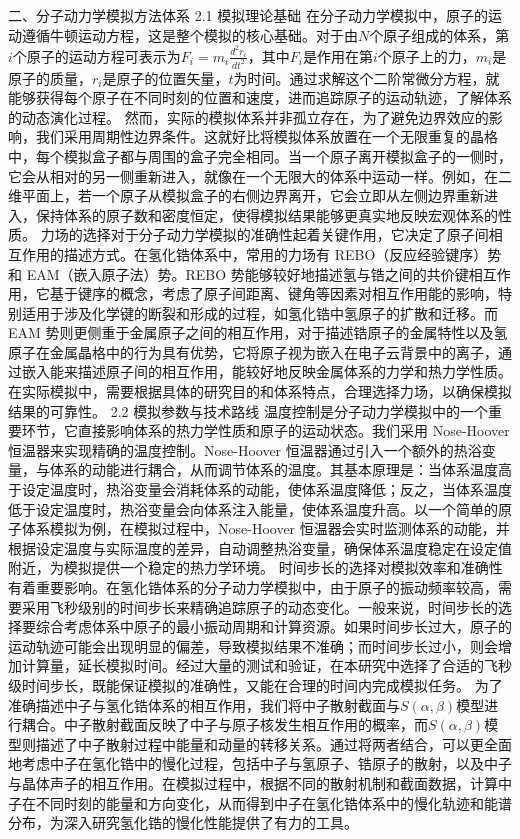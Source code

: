 二、分子动力学模拟方法体系
2.1 模拟理论基础
在分子动力学模拟中，原子的运动遵循牛顿运动方程，这是整个模拟的核心基础。对于由\(N\)个原子组成的体系，第\(i\)个原子的运动方程可表示为\(F_{i}=m_{i}\frac{d^{2}r_{i}}{dt^{2}}\)，其中\(F_{i}\)是作用在第\(i\)个原子上的力，\(m_{i}\)是原子的质量，\(r_{i}\)是原子的位置矢量，\(t\)为时间。通过求解这个二阶常微分方程，就能够获得每个原子在不同时刻的位置和速度，进而追踪原子的运动轨迹，了解体系的动态演化过程。
然而，实际的模拟体系并非孤立存在，为了避免边界效应的影响，我们采用周期性边界条件。这就好比将模拟体系放置在一个无限重复的晶格中，每个模拟盒子都与周围的盒子完全相同。当一个原子离开模拟盒子的一侧时，它会从相对的另一侧重新进入，就像在一个无限大的体系中运动一样。例如，在二维平面上，若一个原子从模拟盒子的右侧边界离开，它会立即从左侧边界重新进入，保持体系的原子数和密度恒定，使得模拟结果能够更真实地反映宏观体系的性质。
力场的选择对于分子动力学模拟的准确性起着关键作用，它决定了原子间相互作用的描述方式。在氢化锆体系中，常用的力场有 REBO（反应经验键序）势和 EAM（嵌入原子法）势。REBO 势能够较好地描述氢与锆之间的共价键相互作用，它基于键序的概念，考虑了原子间距离、键角等因素对相互作用能的影响，特别适用于涉及化学键的断裂和形成的过程，如氢化锆中氢原子的扩散和迁移。而 EAM 势则更侧重于金属原子之间的相互作用，对于描述锆原子的金属特性以及氢原子在金属晶格中的行为具有优势，它将原子视为嵌入在电子云背景中的离子，通过嵌入能来描述原子间的相互作用，能较好地反映金属体系的力学和热力学性质。在实际模拟中，需要根据具体的研究目的和体系特点，合理选择力场，以确保模拟结果的可靠性。
2.2 模拟参数与技术路线
温度控制是分子动力学模拟中的一个重要环节，它直接影响体系的热力学性质和原子的运动状态。我们采用 Nose-Hoover 恒温器来实现精确的温度控制。Nose-Hoover 恒温器通过引入一个额外的热浴变量，与体系的动能进行耦合，从而调节体系的温度。其基本原理是：当体系温度高于设定温度时，热浴变量会消耗体系的动能，使体系温度降低；反之，当体系温度低于设定温度时，热浴变量会向体系注入能量，使体系温度升高。以一个简单的原子体系模拟为例，在模拟过程中，Nose-Hoover 恒温器会实时监测体系的动能，并根据设定温度与实际温度的差异，自动调整热浴变量，确保体系温度稳定在设定值附近，为模拟提供一个稳定的热力学环境。
时间步长的选择对模拟效率和准确性有着重要影响。在氢化锆体系的分子动力学模拟中，由于原子的振动频率较高，需要采用飞秒级别的时间步长来精确追踪原子的动态变化。一般来说，时间步长的选择要综合考虑体系中原子的最小振动周期和计算资源。如果时间步长过大，原子的运动轨迹可能会出现明显的偏差，导致模拟结果不准确；而时间步长过小，则会增加计算量，延长模拟时间。经过大量的测试和验证，在本研究中选择了合适的飞秒级时间步长，既能保证模拟的准确性，又能在合理的时间内完成模拟任务。
为了准确描述中子与氢化锆体系的相互作用，我们将中子散射截面与\(S(\alpha,\beta)\)模型进行耦合。中子散射截面反映了中子与原子核发生相互作用的概率，而\(S(\alpha,\beta)\)模型则描述了中子散射过程中能量和动量的转移关系。通过将两者结合，可以更全面地考虑中子在氢化锆中的慢化过程，包括中子与氢原子、锆原子的散射，以及中子与晶体声子的相互作用。在模拟过程中，根据不同的散射机制和截面数据，计算中子在不同时刻的能量和方向变化，从而得到中子在氢化锆体系中的慢化轨迹和能谱分布，为深入研究氢化锆的慢化性能提供了有力的工具。
